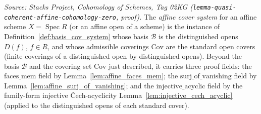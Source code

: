 \begin{definition}

  \label{def:affine_cover_system}
  \textit{Source: Stacks Project, Cohomology of Schemes, Tag 02KG
  (\texttt{lemma-quasi-coherent-affine-cohomology-zero}, proof).}
  The \emph{affine cover system} for an affine scheme \(X = \operatorname{Spec} R\) (or an affine open
  of a scheme) is the instance of Definition~\ref{def:basis_cov_system} whose basis \(\mathcal{B}\) is
  the distinguished opens \(D(f)\), \(f \in R\), and whose admissible coverings \(\mathrm{Cov}\) are
  the standard open covers (finite coverings of a distinguished open by distinguished opens). Beyond
  the basis \(\mathcal{B}\) and the covering set \(\mathrm{Cov}\) just described, it carries three
  proof fields: the \(\mathrm{faces\_mem}\) field by Lemma~\ref{lem:affine_faces_mem}; the
  \(\mathrm{surj\_of\_vanishing}\) field by Lemma~\ref{lem:affine_surj_of_vanishing}; and the
  \(\mathrm{injective\_acyclic}\) field by the family-form injective {\v C}ech-acyclicity
  Lemma~\ref{lem:injective_cech_acyclic} (applied to the distinguished opens of each standard cover).
\end{definition}

